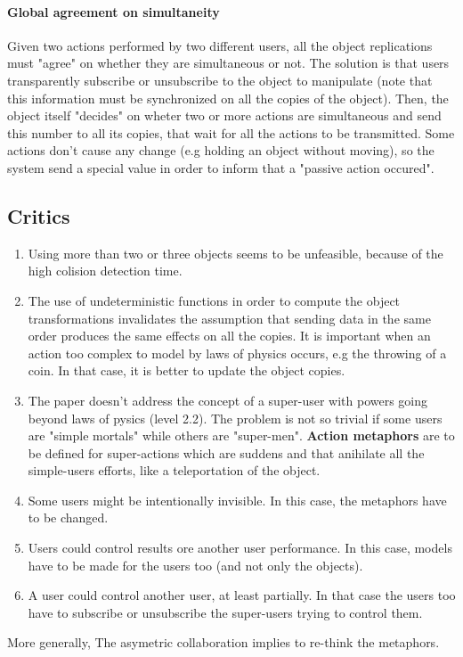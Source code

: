 \documentclass[a4paper]{article}
\begin{document}
\paragraph{Global agreement on simultaneity} Given two actions performed by two different users, all the object replications must "agree" on whether they are simultaneous or not. The solution is that users transparently subscribe or unsubscribe to the object to manipulate (note that this information must be synchronized on all the copies of the object). Then, the object itself "decides" on wheter two or more actions are simultaneous and send this number to all its copies, that wait for all the actions to be transmitted. Some actions don't cause any change (e.g holding an object without moving), so the system send a special value in order to inform that a "passive action occured".

\subsection{Critics}
\begin{enumerate}
	\item Using more than two or three objects seems to be unfeasible, because of the high colision detection time.
	\item The use of undeterministic functions in order to compute the object transformations invalidates the assumption that sending data in the same order produces the same effects on all the copies. It is important when an action too complex to model by laws of physics occurs, e.g the throwing of a coin. In that case, it is better to update the object copies.
	\item The paper doesn't address the concept of a super-user with powers going beyond laws of pysics (level 2.2). The problem is not so trivial if some users are "simple mortals" while others are "super-men". \textbf{Action metaphors} are to be defined for super-actions which are suddens and that anihilate all the simple-users efforts, like a teleportation of the object.
	\item Some users might be intentionally invisible. In this case, the metaphors have to be changed.
	\item Users could control results ore another user performance. In this case, models have to be made for the users too (and not only the objects).
	\item A user could control another user, at least partially. In that case the users too have to subscribe or unsubscribe the super-users trying to control them.
\end{enumerate}
More generally, The asymetric collaboration implies to re-think the metaphors.
\end{document}
